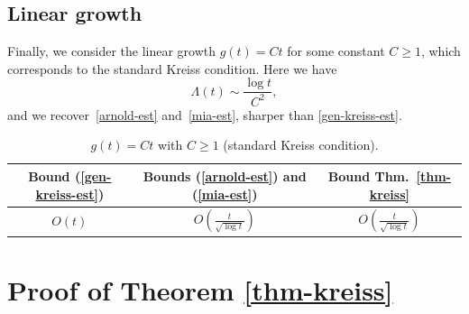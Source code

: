\documentclass[12pt]{amsart}
\theoremstyle{plain}
\theoremstyle{definition}
\numberwithin{equation}{section}
\begin{document}
\subsection{Linear growth}
Finally, we consider the linear growth $g(t)=Ct$ for some constant $C\geq1$,
which corresponds to the standard Kreiss condition.
Here we have
$$
\Lambda(t) \sim \frac{\log t}{C^2},
$$
and we recover~\eqref{arnold-est} and~\eqref{mia-est},
sharper than \eqref{gen-kreiss-est}.

\begin{table}[htbp]
\centering
\renewcommand{\arraystretch}{2.1}
\setlength{\tabcolsep}{16pt}
\begin{tabular}{|c|c|c|}
\hline
\textbf{Bound (\ref{gen-kreiss-est})}
& \textbf{Bounds (\ref{arnold-est}) and (\ref{mia-est})} & \textbf{Bound Thm.\ \ref{thm-kreiss}} \\[1ex]
\hline\hline
 $O(t)$ & $\displaystyle O\left(\frac{t}{\sqrt{\log t}}\right)$
& $\displaystyle O\left(\frac{t}{\sqrt{\log t}}\right)$ \\[1ex]
\hline
\end{tabular}
\vspace{0.25cm}
\caption{$g(t)=Ct$ with $C\geq1$ (standard Kreiss condition).}
\end{table}


\section{Proof of Theorem \ref{thm-kreiss}}
\label{sec:proof}
\end{document}

